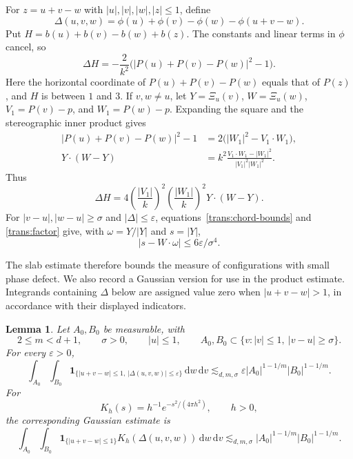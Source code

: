 \documentclass[11pt]{article}
\numberwithin{equation}{section}
\newtheorem{lemma}[theorem]{Lemma}
\newcommand{\dd}{\,\mathrm{d}}
\begin{document}
For \(z=u+v-w\) with \(|u|,|v|,|w|,|z|\leq1\), define
\begin{equation}\label{trans:phase-defect}
 \Delta(u,v,w)=\phi(u)+\phi(v)-\phi(w)-\phi(u+v-w).
\end{equation}
Put \(H=b(u)+b(v)-b(w)+b(z)\).
The constants and linear terms in \(\phi\) cancel, so
\[
 \Delta H
 =-\frac{2}{k^2}\bigl(|P(u)+P(v)-P(w)|^2-1\bigr).
\]
Here the horizontal coordinate of \(P(u)+P(v)-P(w)\) equals
that of \(P(z)\), and \(H\) is between \(1\) and \(3\).
If \(v,w\ne u\), let \(Y=\Xi_u(v)\), \(W=\Xi_u(w)\),
\(V_1=P(v)-p\), and \(W_1=P(w)-p\). Expanding the square and
the stereographic inner product gives
\begin{align*}
 |P(u)+P(v)-P(w)|^2-1
   &=2\bigl(|W_1|^2-V_1\cdot W_1\bigr),\\
 Y\cdot(W-Y)
   &=k^2\frac{V_1\cdot W_1-|W_1|^2}{|V_1|^2|W_1|^2}.
\end{align*}
Thus
\begin{equation}\label{trans:factor}
 \Delta H=4\left(\frac{|V_1|}{k}\right)^2
            \left(\frac{|W_1|}{k}\right)^2Y\cdot(W-Y).
\end{equation}
For \(|v-u|,|w-u|\geq\sigma\) and \(|\Delta|\leq\varepsilon\),
equations~\eqref{trans:chord-bounds} and \eqref{trans:factor} give,
with \(\omega=Y/|Y|\) and \(s=|Y|\),
\begin{equation}\label{trans:collision-slab}
 |s-W\cdot\omega|\leq6\varepsilon/\sigma^4.
\end{equation}

The slab estimate therefore bounds the measure of configurations
with small phase defect. We also record a Gaussian version for use
in the product estimate. Integrands containing \(\Delta\) below are
assigned value zero when \(|u+v-w|>1\), in accordance with their
displayed indicators.

\begin{lemma}\label{trans:row}
Let \(A_0,B_0\) be measurable, with
\[
 2\leq m<d+1,\qquad \sigma>0,\qquad |u|\leq1,\qquad
 A_0,B_0\subset\{v:|v|\leq1,\ |v-u|\geq\sigma\}.
\]
For every \(\varepsilon>0\),
\begin{equation}\label{trans:collision-strip}
 \int_{A_0}\int_{B_0}
 \mathbf1_{\{|u+v-w|\leq1,\,|\Delta(u,v,w)|\leq\varepsilon\}}
    \dd w\dd v
 \lesssim_{d,m,\sigma}\varepsilon
       |A_0|^{1-1/m}|B_0|^{1-1/m}.
\end{equation}
For
\begin{equation}\label{trans:gaussian-kernel}
 K_h(s)=h^{-1}e^{-s^2/(4\pi h^2)},\qquad h>0,
\end{equation}
the corresponding Gaussian estimate is
\begin{equation}\label{trans:collision-gaussian}
 \int_{A_0}\int_{B_0}
 \mathbf1_{\{|u+v-w|\leq1\}}K_h(\Delta(u,v,w))\dd w\dd v
 \lesssim_{d,m,\sigma}|A_0|^{1-1/m}|B_0|^{1-1/m}.
\end{equation}
\end{lemma}
\end{document}
